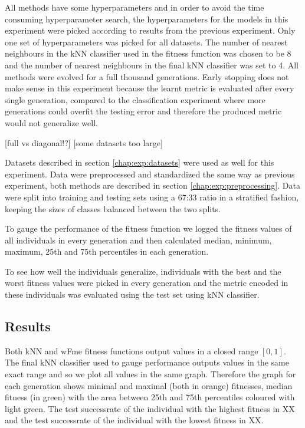 \documentclass[12pt,a4paper]{report}
\begin{document}
All methods have some hyperparameters and in order to avoid the time consuming hyperparameter search, the hyperparameters for the models in this experiment were picked according to results from the previous experiment. Only one set of hyperparameters was picked for all datasets. The number of nearest neighbours in the kNN classifier used in the fitness function was chosen to be 8 and the number of nearest neighbours in the final kNN classifier was set to 4. All methods were evolved for a full thousand generations. Early stopping does not make sense in this experiment because the learnt metric is evaluated after every single generation, compared to the classification experiment where more generations could overfit the testing error and therefore the produced metric would not generalize well.

[full vs diagonal!?]
[some datasets too large]

Datasets described in section \ref{chap:exp:datasets} were used as well for this experiment. Data were preprocessed and standardized the same way as previous experiment, both methods are described in section \ref{chap:exp:preprocessing}. Data were split into training and testing sets using a 67:33 ratio in a stratified fashion, keeping the sizes of classes balanced between the two splits.

To gauge the performance of the fitness function we logged the fitness values of all individuals in every generation and then calculated median, minimum, maximum, 25th and 75th percentiles in each generation.

To see how well the individuals generalize, individuals with the best and the worst fitness values were picked in every generation and the metric encoded in these individuals was evaluated using the test set using kNN classifier.

\subsection{Results}

Both kNN and wFme fitness functions output values in a closed range $[0,1]$. The final kNN classifier used to gauge performance outputs values in the same exact range and so we plot all values in the same graph. Therefore the graph for each generation shows minimal and maximal (both in orange) fitnesses, median fitness (in green) with the area between 25th and 75th percentiles coloured with light green. The test successrate of the individual with the highest fitness in XX and the test successrate of the individual with the lowest fitness in XX.
\end{document}
